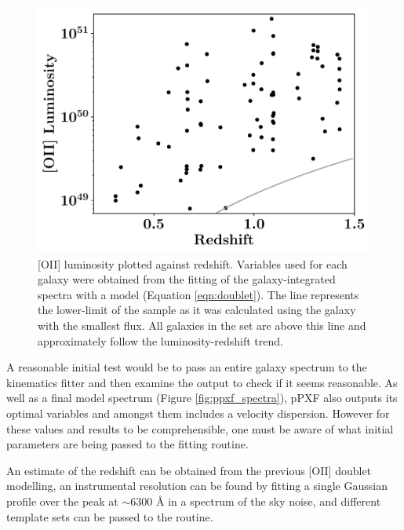 \documentclass[12pt, twocolumn]{revtex4-1}    %
\begin{document}
\begin{figure}
\includegraphics[width=1.0\linewidth]{data/o_ii_luminosity_vs_redshift}
\caption{[OII] luminosity plotted against redshift. Variables used for each galaxy were obtained from the fitting of the galaxy-integrated spectra with a model (Equation \ref{eqn:doublet}). The line represents the lower-limit of the sample as it was calculated using the galaxy with the smallest flux. All galaxies in the set are above this line and approximately follow the luminosity-redshift trend.}
\label{fig:oiiluminosity_redshift}
\end{figure} 

A reasonable initial test would be to pass an entire galaxy spectrum to the kinematics fitter and then examine the output to check if it seems reasonable. As well as a final model spectrum (Figure \ref{fig:ppxf_spectra}), pPXF also outputs its optimal variables and amongst them includes a velocity dispersion. However for these values and results to be comprehensible, one must be aware of what initial parameters are being passed to the fitting routine. 

An estimate of the redshift can be obtained from the previous [OII] doublet modelling, an instrumental resolution can be found by fitting a single Gaussian profile over the peak at $\sim6300$ {\AA} in a spectrum of the sky noise, and different template sets can be passed to the routine. 


\end{document}
